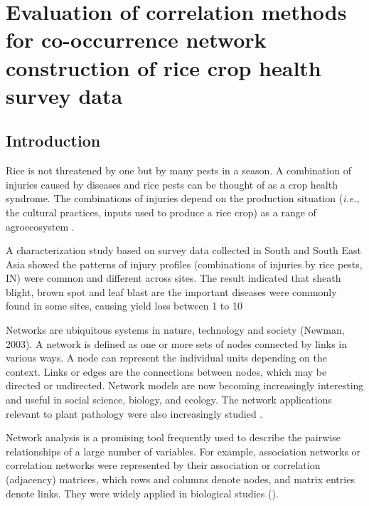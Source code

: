 \section{Evaluation of correlation methods for co-occurrence network construction of rice crop health survey data}

\subsection*{Introduction}

Rice is not threatened by one but by many pests in a season. A combination of injuries caused by diseases and rice pests can be thought of as a crop health syndrome. The combinations of injuries depend on the production situation (\textit{i.e.}, the cultural practices, inputs used to produce a rice crop) as a range of agroecosystem \citep{Savary_2006_Quantification}.

A characterization study based on survey data collected in South and South East Asia \citep{Savary_2000_Characterization} showed the patterns of injury profiles (combinations of injuries by rice pests, IN) were common and different across sites. The result indicated that sheath blight, brown spot and leaf blast are the important diseases were commonly found in some sites, causing yield loss between 1 to 10%

Networks are ubiquitous systems in nature, technology and society (Newman, 2003). A network is defined as one or more sets of nodes connected by links in various ways. A node can represent the individual units depending on the context. Links or edges are the connections between nodes, which may be directed or undirected. Network models are now becoming increasingly interesting and useful in social science, biology, and ecology. The network applications relevant to plant pathology were also increasingly studied \citep{Moslonka_Lefebvre_2011}.

Network analysis is a promising tool frequently used to describe the pairwise relationships of a large number of variables. For example, association networks or correlation networks were represented by their association or correlation (adjacency) matrices, which rows and columns denote nodes, and matrix entries denote links. They were widely applied in biological studies (). 

